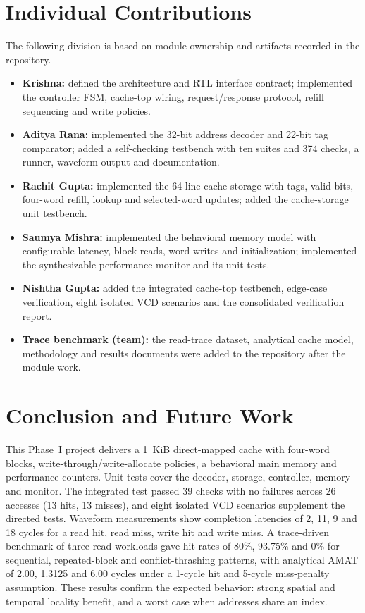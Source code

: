 \documentclass[conference,a4paper]{IEEEtran}
\begin{document}
\section{Individual Contributions}\label{sec:contrib}
The following division is based on module ownership and artifacts recorded in the repository.
\begin{itemize}
\item \textbf{Krishna:} defined the architecture and RTL interface contract; implemented the controller FSM, cache-top wiring, request/response protocol, refill sequencing and write policies.
\item \textbf{Aditya Rana:} implemented the 32-bit address decoder and 22-bit tag comparator; added a self-checking testbench with ten suites and 374 checks, a runner, waveform output and documentation.
\item \textbf{Rachit Gupta:} implemented the 64-line cache storage with tags, valid bits, four-word refill, lookup and selected-word updates; added the cache-storage unit testbench.
\item \textbf{Saumya Mishra:} implemented the behavioral memory model with configurable latency, block reads, word writes and initialization; implemented the synthesizable performance monitor and its unit tests.
\item \textbf{Nishtha Gupta:} added the integrated cache-top testbench, edge-case verification, eight isolated VCD scenarios and the consolidated verification report.
\item \textbf{Trace benchmark (team):} the read-trace dataset, analytical cache model, methodology and results documents were added to the repository after the module work.
\end{itemize}

\section{Conclusion and Future Work}\label{sec:concl}
This Phase~I project delivers a 1~KiB direct-mapped cache with four-word blocks, write-through/write-allocate policies, a behavioral main memory and performance counters. Unit tests cover the decoder, storage, controller, memory and monitor. The integrated test passed 39 checks with no failures across 26 accesses (13 hits, 13 misses), and eight isolated VCD scenarios supplement the directed tests. Waveform measurements show completion latencies of 2, 11, 9 and 18 cycles for a read hit, read miss, write hit and write miss. A trace-driven benchmark of three read workloads gave hit rates of 80\%, 93.75\% and 0\% for sequential, repeated-block and conflict-thrashing patterns, with analytical AMAT of 2.00, 1.3125 and 6.00 cycles under a 1-cycle hit and 5-cycle miss-penalty assumption. These results confirm the expected behavior: strong spatial and temporal locality benefit, and a worst case when addresses share an index.
\end{document}

